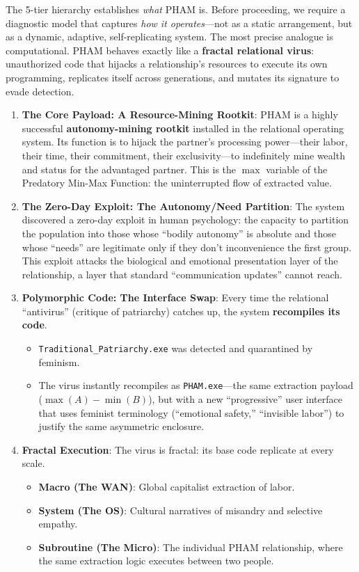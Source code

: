 \documentclass[12pt, letterpaper]{article}
\begin{document}
The 5-tier hierarchy establishes \textit{what} PHAM is. Before proceeding, we require a diagnostic model that captures \textit{how it operates}---not as a static arrangement, but as a dynamic, adaptive, self-replicating system. The most precise analogue is computational. PHAM behaves exactly like a \textbf{fractal relational virus}: unauthorized code that hijacks a relationship's resources to execute its own programming, replicates itself across generations, and mutates its signature to evade detection.

\begin{enumerate}
    \item \textbf{The Core Payload: A Resource-Mining Rootkit}: PHAM is a highly successful \textbf{autonomy-mining rootkit} installed in the relational operating system. Its function is to hijack the partner's processing power---their labor, their time, their commitment, their exclusivity---to indefinitely mine wealth and status for the advantaged partner. This is the $\max$ variable of the Predatory Min-Max Function: the uninterrupted flow of extracted value.
    
    \item \textbf{The Zero-Day Exploit: The Autonomy/Need Partition}: The system discovered a zero-day exploit in human psychology: the capacity to partition the population into those whose ``bodily autonomy'' is absolute and those whose ``needs'' are legitimate only if they don't inconvenience the first group. This exploit attacks the biological and emotional presentation layer of the relationship, a layer that standard ``communication updates'' cannot reach.
    
    \item \textbf{Polymorphic Code: The Interface Swap}: Every time the relational ``antivirus'' (critique of patriarchy) catches up, the system \textbf{recompiles its code}. 
    \begin{itemize}
        \item \texttt{Traditional\_Patriarchy.exe} was detected and quarantined by feminism. 
        \item The virus instantly recompiles as \texttt{PHAM.exe}---the same extraction payload ($\max(A) - \min(B)$), but with a new ``progressive'' user interface that uses feminist terminology (``emotional safety,'' ``invisible labor'') to justify the same asymmetric enclosure.
    \end{itemize}
    
    \item \textbf{Fractal Execution}: The virus is fractal: its base code replicate at every scale.
    \begin{itemize}
        \item \textbf{Macro (The WAN)}: Global capitalist extraction of labor.
        \item \textbf{System (The OS)}: Cultural narratives of misandry and selective empathy.
        \item \textbf{Subroutine (The Micro)}: The individual PHAM relationship, where the same extraction logic executes between two people.
    \end{itemize}
\end{enumerate}
\end{document}
